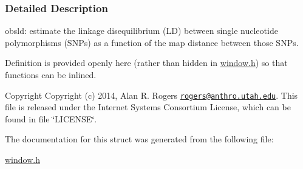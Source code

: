 \subsubsection{Detailed Description}
obsld\-: estimate the linkage disequilibrium (L\-D) between single nucleotide polymorphisms (S\-N\-Ps) as a function of the map distance between those S\-N\-Ps. 

Definition is provided openly here (rather than hidden in \hyperlink{window_8h}{window.\-h}) so that functions can be inlined.

\begin{DoxyCopyright}{Copyright}
Copyright (c) 2014, Alan R. Rogers \href{mailto:rogers@anthro.utah.edu}{\tt rogers@anthro.\-utah.\-edu}. This file is released under the Internet Systems Consortium License, which can be found in file \char`\"{}\-L\-I\-C\-E\-N\-S\-E\char`\"{}. 
\end{DoxyCopyright}


The documentation for this struct was generated from the following file\-:\begin{DoxyCompactItemize}
\item 
\hyperlink{window_8h}{window.\-h}\end{DoxyCompactItemize}
